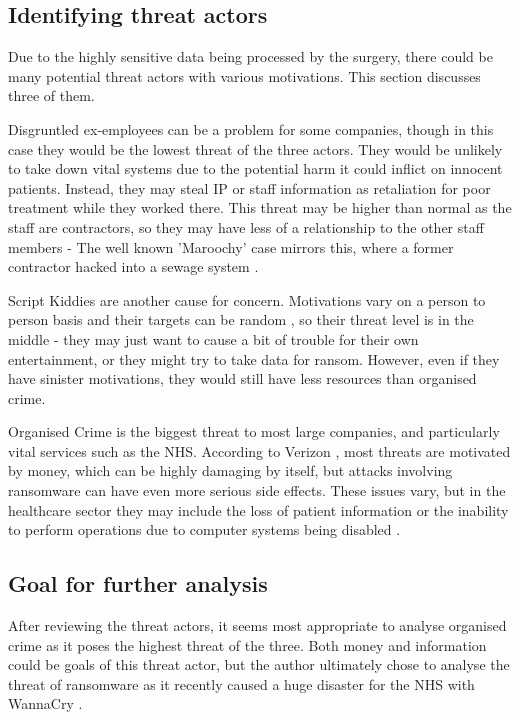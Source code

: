 \documentclass[12pt,a4paper]{article}
\begin{document}
\subsection{Identifying threat actors}
Due to the highly sensitive data being processed by the surgery, there could be many potential threat actors with various motivations. This section discusses three of them.

Disgruntled ex-employees can be a problem for some companies, though in this case they would be the lowest threat of the three actors. They would be unlikely to take down vital systems due to the potential harm it could inflict on innocent patients. Instead, they may steal IP or staff information as retaliation for poor treatment while they worked there. This threat may be higher than normal as the staff are contractors, so they may have less of a relationship to the other staff members - The well known 'Maroochy' case mirrors this, where a former contractor hacked into a sewage system \cite{exemployee}.

Script Kiddies are another cause for concern. Motivations vary on a person to person basis and their targets can be random \cite{scriptKiddies}, so their threat level is in the middle - they may just want to cause a bit of trouble for their own entertainment, or they might try to take data for ransom. However, even if they have sinister motivations, they would still have less resources than organised crime. 

Organised Crime is the biggest threat to most large companies, and particularly vital services such as the NHS. According to Verizon \cite{verizon}, most threats are motivated by money, which can be highly damaging by itself, but  attacks involving ransomware can have even more serious side effects. These issues vary, but in the healthcare sector they may include the loss of patient information or the inability to perform operations due to computer systems being disabled \cite{organisedCrime}.

\subsection{Goal for further analysis}
After reviewing the threat actors, it seems most appropriate to analyse organised crime as it poses the highest threat of the three. Both money and information could be goals of this threat actor, but the author ultimately chose to analyse the threat of ransomware as it recently caused a huge disaster for the NHS with WannaCry \cite{wannaCry}.
\end{document}
